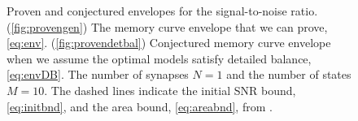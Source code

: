 \documentclass[12pt]{article}
\begin{document}
\begin{figure}[tb]
  \centering
  \begin{myenuma}
  \item{}\label{fig:provengen}
  \item{}\label{fig:provendetbal}
  \end{myenuma}
  \caption[Proven and conjectured envelopes for the signal-to-noise ratio]
  {Proven and conjectured envelopes for the signal-to-noise ratio.
  (\ref{fig:provengen}) The memory curve envelope that we can prove, \cref{eq:env}.
  (\ref{fig:provendetbal}) Conjectured memory curve envelope when we assume the optimal models satisfy detailed balance, \cref{eq:envDB}.
  The number of synapses \(N=1\) and the number of states \(M=10\).
  The dashed lines indicate the initial SNR bound, \eqref{eq:initbnd}, and the area bound, \eqref{eq:areabnd}, from \cite{Lahiri2013synapse}.}\label{fig:envproven}
\end{figure}
\end{document}
